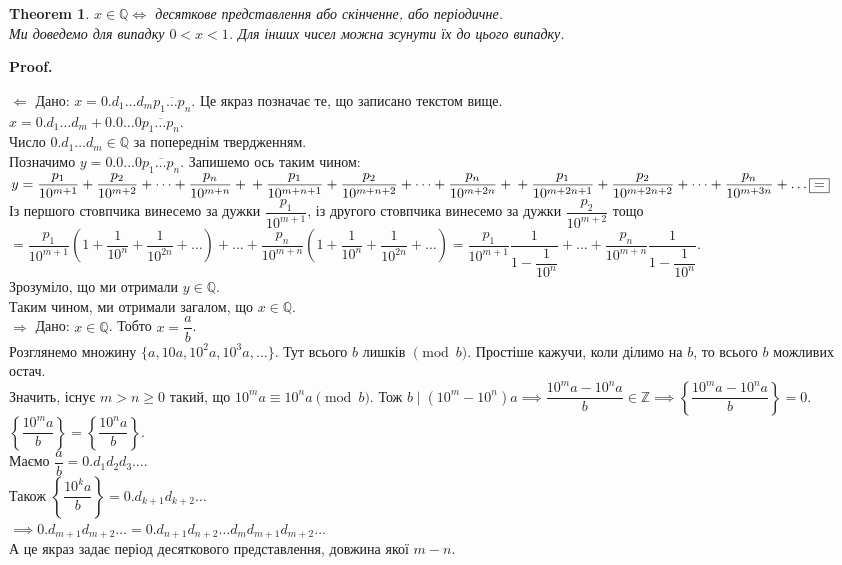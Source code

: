 \documentclass[a4paper, 14pt]{extarticle}
\makeatletter
\theoremstyle{theoremdd}
\newtheorem{theorem}{Theorem}[subsection]
\theoremstyle{theoremdd}
\theoremstyle{theoremdd}
\theoremstyle{theoremdd}
\theoremstyle{theoremdd}
\theoremstyle{theoremdd}
\theoremstyle{theoremdd}
\theoremstyle{theoremdd}
\def\qed{$\blacksquare$}
\def\rightproof{$\boxed{\Rightarrow}$ }
\def\leftproof{$\boxed{\Leftarrow}$ }
\renewenvironment{proof}[1][Proof.\\]{\par
\pushQED{\hfill \qed}%
\normalfont \topsep6\p@\@plus6\p@\relax
\trivlist
\item\relax
{\bfseries
#1\@addpunct{.}}\hspace\labelsep\ignorespaces
}{%
\popQED\endtrivlist\@endpefalse
}
\makeatother
\begin{document}
\begin{theorem}
$x \in \mathbb{Q} \iff$ десяткове представлення або скінченне, або періодичне.\\
\textit{Ми доведемо для випадку $0 < x < 1$. Для інших чисел можна зсунути їх до цього випадку.}
\end{theorem}

\begin{proof}
\leftproof Дано: $x = 0.d_1\dots d_m \overline{p_1 \dots p_n}$. Це якраз позначає те, що записано текстом вище.\\
$x = 0.d_1\dots d_m + 0.0\dots 0 \overline{p_1\dots p_n}$.\\
Число $0.d_1\dots d_m \in \mathbb{Q}$ за попереднім твердженням.\\
Позначимо $y = 0.0\dots 0 \overline{p_1 \dots p_n}$. Запишемо ось таким чином:\\
$y = \dfrac{p_1}{10^{m+1}} + \dfrac{p_2}{10^{m+2}} + \dots + \dfrac{p_n}{10^{m+n}} + \\
+ \dfrac{p_1}{10^{m+n+1}} + \dfrac{p_2}{10^{m+n+2}} + \dots + \dfrac{p_n}{10^{m+2n}} + \\
+ \dfrac{p_1}{10^{m+2n+1}} + \dfrac{p_2}{10^{m+2n+2}} + \dots + \dfrac{p_n}{10^{m+3n}} + \dots \boxed{=}$\\
Із першого стовпчика винесемо за дужки $\dfrac{p_1}{10^{m+1}}$, із другого стовпчика винесемо за дужки $\dfrac{p_2}{10^{m+2}}$ тощо\\
$\boxed{=} \dfrac{p_1}{10^{m+1}} \left( 1 + \dfrac{1}{10^n} + \dfrac{1}{10^{2n}} + \dots \right) + \dots + \dfrac{p_n}{10^{m+n}} \left( 1 + \dfrac{1}{10^n} + \dfrac{1}{10^{2n}} + \dots \right) = \dfrac{p_1}{10^{m+1}} \dfrac{1}{1-\dfrac{1}{10^n}} + \dots + \dfrac{p_n}{10^{m+n}} \dfrac{1}{1-\dfrac{1}{10^n}}$.\\
Зрозуміло, що ми отримали $y \in \mathbb{Q}$.\\
Таким чином, ми отримали загалом, що $x \in \mathbb{Q}$.
\bigskip \\
\rightproof Дано: $x \in \mathbb{Q}$. Тобто $x = \dfrac{a}{b}$.\\
Розглянемо множину $\{a,10a,10^2a,10^3a,\dots\}$. Тут всього $b$ лишків $\pmod b$. Простіше кажучи, коли ділимо на $b$, то всього $b$ можливих остач.\\
Значить, існує $m > n \geq 0$ такий, що $10^m a \equiv 10^n a \pmod b$. Тож $b \mid (10^m-10^n)a \implies \dfrac{10^ma-10^na}{b} \in \mathbb{Z} \implies \left\{ \dfrac{10^m a - 10^n a}{b} \right\} = 0$.\\
$\left\{ \dfrac{10^m a}{b} \right\} = \left\{ \dfrac{10^n a}{b} \right\}$.\\
Маємо $\dfrac{a}{b} = 0.d_1d_2d_3\dots$.\\
Також $\left\{ \dfrac{10^k a}{b} \right\} = 0.d_{k+1}d_{k+2}\dots$\\
$\implies 0.d_{m+1}d_{m+2} \dots = 0.d_{n+1}d_{n+2} \dots d_{m} d_{m+1} d_{m+2} \dots$\\
А це якраз задає період десяткового представлення, довжина якої $m-n$.
\end{proof}
\fi
\newpage
\end{document}
